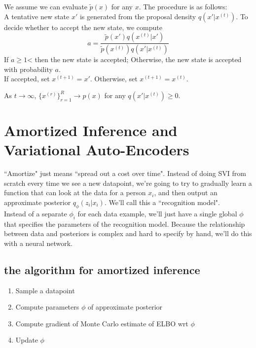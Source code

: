 \documentclass[11pt]{article}
\begin{document}
\noindent We assume we can evaluate $\tilde{p}(x)$ for any $x$. The procedure is as follows:\\
A tentative new state $x'$ is generated from the proposal density $q(x'|x^{(t)})$. To decide whether to accept the new state, we compute
$$a = \frac{\tilde{p}(x')q(x^{(t)}|x')}{\tilde{p}(x^{(t)})q(x'|x^{(t)})}$$
If $a \geq 1$< then the new state is accepted; Otherwise, the new state is accepted with probability $a$.\\
If accepted, set $x^{(t+1)} = x'$. Otherwise, set $x^{(t+1)} = x^{(t)}$.

\theorem
As $t \rightarrow \infty$, $\{x^{(r)}\}_{r=1}^R \rightarrow p(x)$ for any $q(x'|x^{(t)}) \geq 0$.

\remark
{}

\section{Amortized Inference and Variational Auto-Encoders}
``Amortize" just means ``spread out a cost over time". Instead of doing SVI from scratch every time we see a new datapoint, we're going to try to gradually learn a function that can look at the data for a person $x_i$, and then output an approximate posterior $q_\phi(z_i|x_i)$. We'll call this a ``recognition model".\\
Instead of a separate $\phi_i$ for each data example, we'll just have a single global $\phi$ that specifies the parameters of the recognition model. Because the relationship between data and posteriors is complex and hard to specify by hand, we'll do this with a neural network.\\
\subsection{the algorithm for amortized inference}
\begin{enumerate}
	\item Sample a datapoint
	\item Compute parameters $\phi$ of approximate posterior
	\item Compute gradient of Monte Carlo estimate of ELBO wrt $\phi$
	\item Update $\phi$
\end{enumerate}
\end{document}
